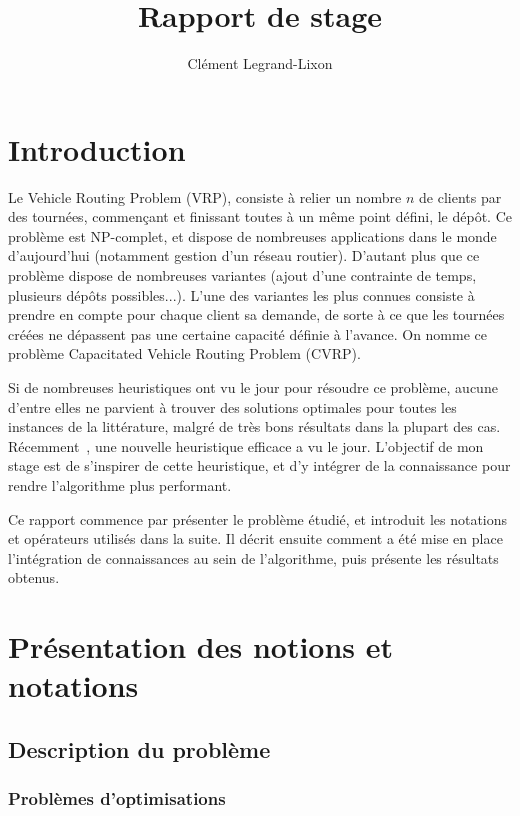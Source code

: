 \documentclass[a4paper,11pt]{article}%
\begin{document}
\title{Rapport de stage}

\author{Clément Legrand-Lixon}

\maketitle


\section*{Introduction}
Le Vehicle Routing Problem (VRP), consiste à relier un nombre $n$ de clients par des tournées, commençant et finissant toutes à un même point défini, le dépôt. 
Ce problème est NP-complet, et dispose de nombreuses applications dans le monde d'aujourd'hui (notamment gestion d'un réseau routier). 
D'autant plus que ce problème dispose de nombreuses variantes (ajout d'une contrainte de temps, plusieurs dépôts possibles...). 
L'une des variantes les plus connues consiste à prendre en compte pour chaque client sa demande, de sorte à ce que les tournées créées ne dépassent pas une certaine capacité définie à l'avance. 
On nomme ce problème Capacitated Vehicle Routing Problem (CVRP). 

Si de nombreuses heuristiques ont vu le jour pour résoudre ce problème, aucune d'entre elles ne parvient à trouver des solutions optimales pour toutes les instances de la littérature, malgré de très bons résultats dans la plupart des cas. Récemment~\cite{Sorensen_2017}, une nouvelle heuristique efficace a vu le jour. L'objectif de mon stage est de s'inspirer de cette heuristique, et d'y intégrer de la connaissance pour rendre l'algorithme plus performant.

Ce rapport commence par présenter le problème étudié, et introduit les notations et opérateurs utilisés dans la suite. 
Il décrit ensuite comment a été mise en place l'intégration de connaissances au sein de l'algorithme, puis présente les résultats obtenus.   

\section{Présentation des notions et notations}

\subsection{Description du problème}

\subsubsection{Problèmes d'optimisations}
\end{document}
